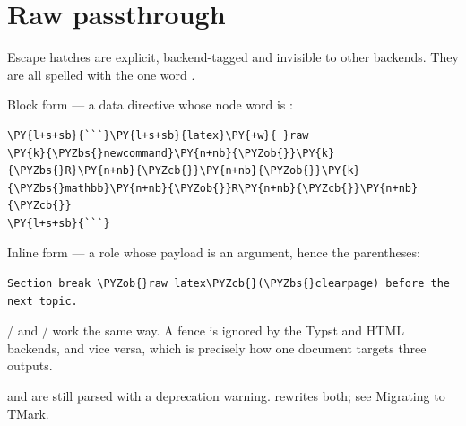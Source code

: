 \documentclass[a4paper,twoside]{article}
\begin{document}
\section{Raw passthrough}
Escape hatches are explicit, backend-tagged and invisible to other backends.
They are all spelled with the one word .

Block form --- a data directive whose node word is :
\begin{tscode}[lang=md, engine=pygments]
\begin{Verbatim}[commandchars=\\\{\},breaklines, breakanywhere, commandchars=\\\{\}]
\PY{l+s+sb}{```}\PY{l+s+sb}{latex}\PY{+w}{ }raw
\PY{k}{\PYZbs{}newcommand}\PY{n+nb}{\PYZob{}}\PY{k}{\PYZbs{}R}\PY{n+nb}{\PYZcb{}}\PY{n+nb}{\PYZob{}}\PY{k}{\PYZbs{}mathbb}\PY{n+nb}{\PYZob{}}R\PY{n+nb}{\PYZcb{}}\PY{n+nb}{\PYZcb{}}
\PY{l+s+sb}{```}
\end{Verbatim}
\end{tscode}
Inline form --- a role whose payload is an argument, hence the parentheses:
\begin{tscode}[lang=md, engine=pygments]
\begin{Verbatim}[commandchars=\\\{\},breaklines, breakanywhere, commandchars=\\\{\}]
Section break \PYZob{}raw latex\PYZcb{}(\PYZbs{}clearpage) before the next topic.
\end{Verbatim}
\end{tscode}
 /  and  /  work the same
way. A  fence is ignored by the Typst and HTML backends, and vice
versa, which is precisely how one document targets three outputs.
\begin{tscallout}[kind=note, title={The 0.6 spellings are deprecated}]
 and  are still parsed with a deprecation
warning.  rewrites both; see
Migrating to TMark.
\end{tscallout}
\end{document}
